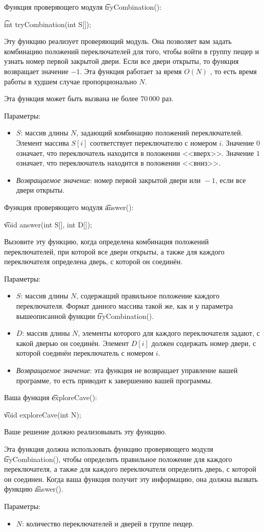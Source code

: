 Функция проверяющего модуля \t{tryCombination()}:

\t{int tryCombination(int S[]);}

Эту функцию реализует проверяющий модуль. Она позволяет вам задать комбинацию положений переключателей для того, чтобы войти в группу пещер и узнать номер первой закрытой двери. Если все двери открыты, то функция возвращает значение
­$-1$. Эта функция работает за время $O(N)$ , то есть время работы в худшем случае пропорционально $N$.

Эта функция может быть вызвана не более $70\,000$ раз.

Параметры:
\begin{itemize}
\item $S$: массив длины $N$, задающий комбинацию положений переключателей. Элемент массива $S[i]$ соответствует переключателю с номером $i$. Значение $0$ означает, что переключатель находится в положении <<вверх>>. Значение $1$ означает, что переключатель находится в положении <<вниз>>.
\item \textit{Возвращаемое значение}: номер первой закрытой двери или $­-1$, если все двери открыты.
\end{itemize}



Функция проверяющего модуля \t{answer()}:

\t{void answer(int S[], int D[]);}

Вызовите эту функцию, когда определена комбинация положений переключателей, при которой все двери открыты, а также для каждого переключателя определена дверь, с которой он соединён.

Параметры:
\begin{itemize}
\item $S$: массив длины $N$, содержащий правильное положение каждого переключателя. Формат данного массива такой же, как и у параметра вышеописанной функции \t{tryCombination()}.
\item $D$: массив длины $N$, элементы которого для каждого переключателя задают, с какой дверью он соединён. Элемент $D[i]$ должен содержать номер двери, с которой соединён переключатель с номером $i$.
\item \textit{Возвращаемое значение}: эта функция не возвращает управление вашей программе, то есть приводит к завершению вашей программы.
\end{itemize}



Ваша функция \t{exploreCave()}:

\t{void exploreCave(int N);}

Ваше решение должно реализовывать эту функцию.

Эта функция должна использовать функцию проверяющего модуля \t{tryCombination()}, чтобы определить правильное положение для каждого переключателя, а также для каждого переключателя определить дверь, с которой он соединен. Когда ваша функция получит эту информацию, она должна вызвать
функцию \t{answer()}.

Параметры:
\begin{itemize}
\item $N$: количество переключателей и дверей в группе пещер.
\end{itemize}

